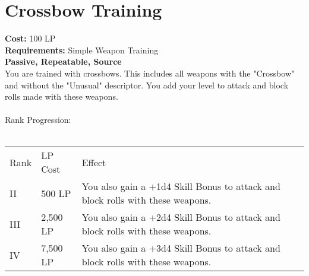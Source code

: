 \section{Crossbow Training}\label{perk:crossbowTraining}
\textbf{Cost:} 100 LP\\
\textbf{Requirements:} Simple Weapon Training\\
\textbf{Passive, Repeatable, Source}\\
You are trained with crossbows.
This includes all weapons with the "Crossbow" and without the "Unusual" descriptor.
You add your level to attack and block rolls made with these weapons.\\
\\
Rank Progression:\\
\\
\begin{longtable}{l | l | p{9cm}}
	Rank & LP Cost & Effect\\
	II & 500 LP & You also gain a +1d4 Skill Bonus to attack and block rolls with these weapons.\\
	III & 2,500 LP & You also gain a +2d4 Skill Bonus to attack and block rolls with these weapons.\\
	IV & 7,500 LP & You also gain a +3d4 Skill Bonus to attack and block rolls with these weapons.\\
\end{longtable}